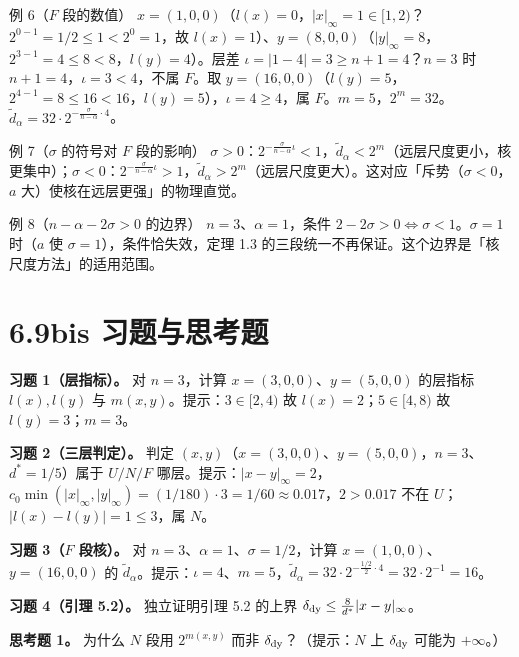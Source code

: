 \documentclass[a4paper,11pt,openany]{ctexbook}
\numberwithin{equation}{chapter}
\numberwithin{figure}{chapter}
\numberwithin{table}{chapter}
\begin{document}
\begin{examplebox}{例 6（$F$ 段的数值）}
$x=(1,0,0)$（$l(x)=0$，$|x|_\infty=1\in[1,2)$？$2^{0-1}=1/2\le1<2^0=1$，故 $l(x)=1$）、$y=(8,0,0)$（$|y|_\infty=8$，$2^{3-1}=4\le8<8$，$l(y)=4$）。层差 $\iota=|1-4|=3\ge n+1=4$？$n=3$ 时 $n+1=4$，$\iota=3<4$，不属 $F$。取 $y=(16,0,0)$（$l(y)=5$，$2^{4-1}=8\le16<16$，$l(y)=5$），$\iota=4\ge4$，属 $F$。$m=5$，$2^m=32$。$\widetilde d_\alpha=32\cdot2^{-\frac{\sigma}{n-\alpha}\cdot4}$。
\end{examplebox}

\begin{examplebox}{例 7（$\sigma$ 的符号对 $F$ 段的影响）}
$\sigma>0$：$2^{-\frac{\sigma}{n-\alpha}\iota}<1$，$\widetilde d_\alpha<2^m$（远层尺度更小，核更集中）；$\sigma<0$：$2^{-\frac{\sigma}{n-\alpha}\iota}>1$，$\widetilde d_\alpha>2^m$（远层尺度更大）。这对应「斥势（$\sigma<0$，$a$ 大）使核在远层更强」的物理直觉。
\end{examplebox}

\begin{examplebox}{例 8（$n-\alpha-2\sigma>0$ 的边界）}
$n=3$、$\alpha=1$，条件 $2-2\sigma>0\iff\sigma<1$。$\sigma=1$ 时（$a$ 使 $\sigma=1$），条件恰失效，定理 1.3 的三段统一不再保证。这个边界是「核尺度方法」的适用范围。
\end{examplebox}

\section{6.9bis 习题与思考题}

\textbf{习题 1（层指标）。} 对 $n=3$，计算 $x=(3,0,0)$、$y=(5,0,0)$ 的层指标 $l(x),l(y)$ 与 $m(x,y)$。提示：$3\in[2,4)$ 故 $l(x)=2$；$5\in[4,8)$ 故 $l(y)=3$；$m=3$。

\textbf{习题 2（三层判定）。} 判定 $(x,y)$（$x=(3,0,0)$、$y=(5,0,0)$，$n=3$、$d^*=1/5$）属于 $U/N/F$ 哪层。提示：$|x-y|_\infty=2$，$c_0\min(|x|_\infty,|y|_\infty)=(1/180)\cdot3=1/60\approx0.017$，$2>0.017$ 不在 $U$；$|l(x)-l(y)|=1\le3$，属 $N$。

\textbf{习题 3（$F$ 段核）。} 对 $n=3$、$\alpha=1$、$\sigma=1/2$，计算 $x=(1,0,0)$、$y=(16,0,0)$ 的 $\widetilde d_\alpha$。提示：$\iota=4$、$m=5$，$\widetilde d_\alpha=32\cdot2^{-\frac{1/2}{2}\cdot4}=32\cdot2^{-1}=16$。

\textbf{习题 4（引理 5.2）。} 独立证明引理 5.2 的上界 $\delta_{\rm dy}\le\frac8{d^*}|x-y|_\infty$。

\textbf{思考题 1。} 为什么 $N$ 段用 $2^{m(x,y)}$ 而非 $\delta_{\rm dy}$？（提示：$N$ 上 $\delta_{\rm dy}$ 可能为 $+\infty$。）
\end{document}
